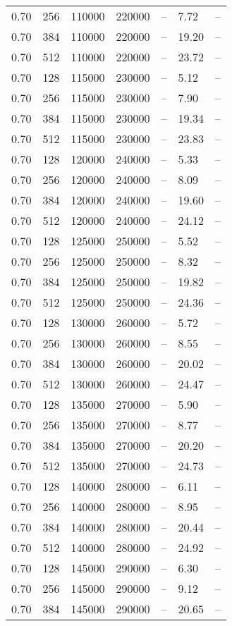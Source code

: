 \begin{tabular}{l|l|l|l|l|l|l}
0.70 & 256 & 110000 & 220000 & -- &  7.72 & --\\
0.70 & 384 & 110000 & 220000 & -- & 19.20 & --\\
0.70 & 512 & 110000 & 220000 & -- & 23.72 & --\\
0.70 & 128 & 115000 & 230000 & -- &  5.12 & --\\
0.70 & 256 & 115000 & 230000 & -- &  7.90 & --\\
0.70 & 384 & 115000 & 230000 & -- & 19.34 & --\\
0.70 & 512 & 115000 & 230000 & -- & 23.83 & --\\
0.70 & 128 & 120000 & 240000 & -- &  5.33 & --\\
0.70 & 256 & 120000 & 240000 & -- &  8.09 & --\\
0.70 & 384 & 120000 & 240000 & -- & 19.60 & --\\
0.70 & 512 & 120000 & 240000 & -- & 24.12 & --\\
0.70 & 128 & 125000 & 250000 & -- &  5.52 & --\\
0.70 & 256 & 125000 & 250000 & -- &  8.32 & --\\
0.70 & 384 & 125000 & 250000 & -- & 19.82 & --\\
0.70 & 512 & 125000 & 250000 & -- & 24.36 & --\\
0.70 & 128 & 130000 & 260000 & -- &  5.72 & --\\
0.70 & 256 & 130000 & 260000 & -- &  8.55 & --\\
0.70 & 384 & 130000 & 260000 & -- & 20.02 & --\\
0.70 & 512 & 130000 & 260000 & -- & 24.47 & --\\
0.70 & 128 & 135000 & 270000 & -- &  5.90 & --\\
0.70 & 256 & 135000 & 270000 & -- &  8.77 & --\\
0.70 & 384 & 135000 & 270000 & -- & 20.20 & --\\
0.70 & 512 & 135000 & 270000 & -- & 24.73 & --\\
0.70 & 128 & 140000 & 280000 & -- &  6.11 & --\\
0.70 & 256 & 140000 & 280000 & -- &  8.95 & --\\
0.70 & 384 & 140000 & 280000 & -- & 20.44 & --\\
0.70 & 512 & 140000 & 280000 & -- & 24.92 & --\\
0.70 & 128 & 145000 & 290000 & -- &  6.30 & --\\
0.70 & 256 & 145000 & 290000 & -- &  9.12 & --\\
0.70 & 384 & 145000 & 290000 & -- & 20.65 & --\\

\end{tabular}
